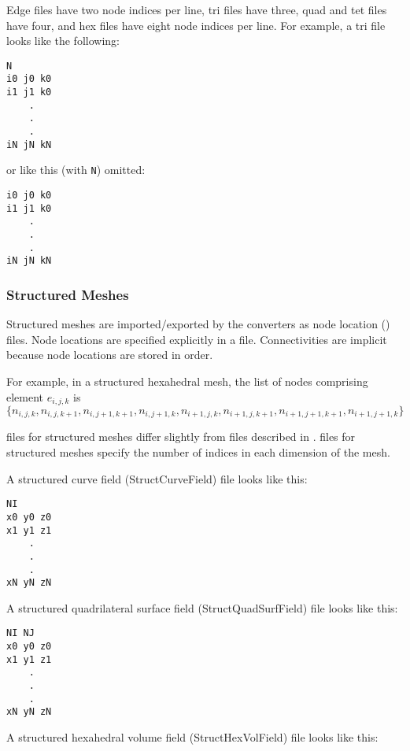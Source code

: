 Edge files have two node indices per line, tri files have three, quad
and tet files have four, and hex files have eight node indices per
line.  For example, a tri file looks like the following:

\begin{verbatim}
N
i0 j0 k0
i1 j1 k0
    .
    .
    .
iN jN kN
\end{verbatim}

or like this (with \verb|N|) omitted:

\begin{verbatim}
i0 j0 k0
i1 j1 k0
    .
    .
    .
iN jN kN
\end{verbatim}

\subsubsection{Structured Meshes}

Structured meshes are imported/exported by the converters as node
location () files.  Node locations are specified explicitly in a
 file. Connectivities are implicit because node locations are
stored in  order.

For example, in a structured hexahedral mesh, the list of nodes comprising
element \(e_{i,j,k}\) is \(\{n_{i,j,k}, n_{i,j,k+1}, n_{i,j+1,k+1}, n_{i,j+1,k}, n_{i+1,j,k}, n_{i+1,j,k+1}, n_{i+1,j+1,k+1}, n_{i+1,j+1,k}\}\)

 files for structured meshes differ slightly
from  files described in .   files for
structured meshes specify the number of indices in each dimension of the
mesh. 

A structured curve field (StructCurveField)  file looks
like this:

\begin{verbatim}
NI
x0 y0 z0
x1 y1 z1
    .
    .
    .
xN yN zN
\end{verbatim}

A structured quadrilateral surface field
(StructQuadSurfField)  file looks like this:

\begin{verbatim}
NI NJ
x0 y0 z0
x1 y1 z1
    .
    .
    .
xN yN zN
\end{verbatim}

A structured hexahedral volume field (StructHexVolField)
 file looks like this:

